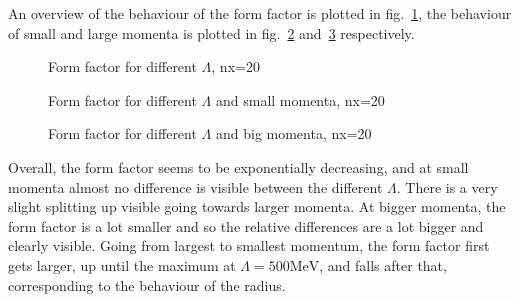 \documentclass{scrartcl}
\begin{document}
An overview of the behaviour of the form factor is plotted in fig.~\ref{fig:formfactor}, the behaviour of small and large momenta is plotted in fig.~\ref{fig:formfactorsmall} and~\ref{fig:formfactorbig} respectively.

\begin{figure}[htbp]
	
	\caption{Form factor for different $\Lambda$, nx=20}
	\label{fig:formfactor}
\end{figure}

\begin{figure}[htbp]
	
	\caption{Form factor for different $\Lambda$ and small momenta, nx=20}
	\label{fig:formfactorsmall}
\end{figure}

\begin{figure}[htbp]
	
	\caption{Form factor for different $\Lambda$ and big momenta, nx=20}
	\label{fig:formfactorbig}
\end{figure}


Overall, the form factor seems to be exponentially decreasing, and at small momenta almost no difference is visible between the different $\Lambda$. There is a very slight splitting up visible going towards larger momenta. At bigger momenta, the form factor is a lot smaller and so the relative differences are a lot bigger and clearly visible. Going from largest to smallest momentum, the form factor first gets larger, up until the maximum at $\Lambda=500\si{\mega\electronvolt}$, and falls after that, corresponding to the behaviour of the radius. 

\newpage
\listoffigures
\listoftables
\printbibliography
\end{document}
